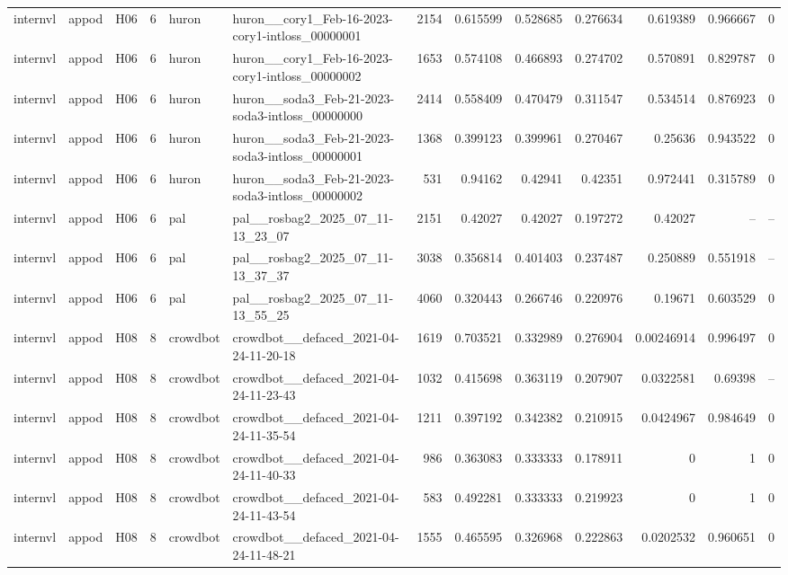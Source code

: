 \begin{longtable}{lllrllrrrrrrr}
internvl & appod & H06 & 6 & huron & huron\_\_cory1\_Feb-16-2023-cory1-intloss\_00000001 & 2154 & 0.615599 & 0.528685 & 0.276634 & 0.619389 & 0.966667 & 0 \\
internvl & appod & H06 & 6 & huron & huron\_\_cory1\_Feb-16-2023-cory1-intloss\_00000002 & 1653 & 0.574108 & 0.466893 & 0.274702 & 0.570891 & 0.829787 & 0 \\
internvl & appod & H06 & 6 & huron & huron\_\_soda3\_Feb-21-2023-soda3-intloss\_00000000 & 2414 & 0.558409 & 0.470479 & 0.311547 & 0.534514 & 0.876923 & 0 \\
internvl & appod & H06 & 6 & huron & huron\_\_soda3\_Feb-21-2023-soda3-intloss\_00000001 & 1368 & 0.399123 & 0.399961 & 0.270467 & 0.25636 & 0.943522 & 0 \\
internvl & appod & H06 & 6 & huron & huron\_\_soda3\_Feb-21-2023-soda3-intloss\_00000002 & 531 & 0.94162 & 0.42941 & 0.42351 & 0.972441 & 0.315789 & 0 \\
internvl & appod & H06 & 6 & pal & pal\_\_rosbag2\_2025\_07\_11-13\_23\_07 & 2151 & 0.42027 & 0.42027 & 0.197272 & 0.42027 & -- & -- \\
internvl & appod & H06 & 6 & pal & pal\_\_rosbag2\_2025\_07\_11-13\_37\_37 & 3038 & 0.356814 & 0.401403 & 0.237487 & 0.250889 & 0.551918 & -- \\
internvl & appod & H06 & 6 & pal & pal\_\_rosbag2\_2025\_07\_11-13\_55\_25 & 4060 & 0.320443 & 0.266746 & 0.220976 & 0.19671 & 0.603529 & 0 \\
internvl & appod & H08 & 8 & crowdbot & crowdbot\_\_defaced\_2021-04-24-11-20-18 & 1619 & 0.703521 & 0.332989 & 0.276904 & 0.00246914 & 0.996497 & 0 \\
internvl & appod & H08 & 8 & crowdbot & crowdbot\_\_defaced\_2021-04-24-11-23-43 & 1032 & 0.415698 & 0.363119 & 0.207907 & 0.0322581 & 0.69398 & -- \\
internvl & appod & H08 & 8 & crowdbot & crowdbot\_\_defaced\_2021-04-24-11-35-54 & 1211 & 0.397192 & 0.342382 & 0.210915 & 0.0424967 & 0.984649 & 0 \\
internvl & appod & H08 & 8 & crowdbot & crowdbot\_\_defaced\_2021-04-24-11-40-33 & 986 & 0.363083 & 0.333333 & 0.178911 & 0 & 1 & 0 \\
internvl & appod & H08 & 8 & crowdbot & crowdbot\_\_defaced\_2021-04-24-11-43-54 & 583 & 0.492281 & 0.333333 & 0.219923 & 0 & 1 & 0 \\
internvl & appod & H08 & 8 & crowdbot & crowdbot\_\_defaced\_2021-04-24-11-48-21 & 1555 & 0.465595 & 0.326968 & 0.222863 & 0.0202532 & 0.960651 & 0 \\

\end{longtable}
